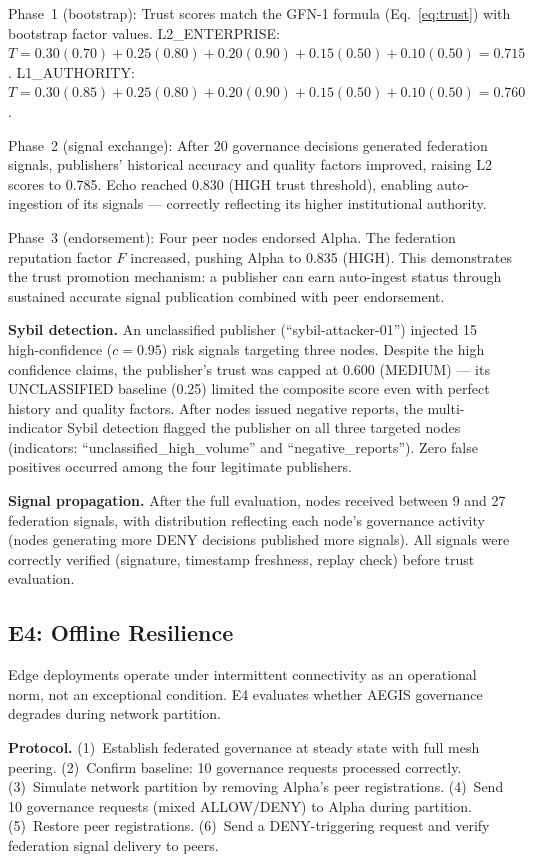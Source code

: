 \documentclass[journal]{IEEEtran}
\begin{document}
Phase~1 (bootstrap): Trust scores match the GFN-1 formula (Eq.~\ref{eq:trust}) with bootstrap factor values. L2\_ENTERPRISE: $T = 0.30(0.70) + 0.25(0.80) + 0.20(0.90) + 0.15(0.50) + 0.10(0.50) = 0.715$. L1\_AUTHORITY: $T = 0.30(0.85) + 0.25(0.80) + 0.20(0.90) + 0.15(0.50) + 0.10(0.50) = 0.760$.

Phase~2 (signal exchange): After 20 governance decisions generated federation signals, publishers' historical accuracy and quality factors improved, raising L2 scores to 0.785. Echo reached 0.830 (HIGH trust threshold), enabling auto-ingestion of its signals --- correctly reflecting its higher institutional authority.

Phase~3 (endorsement): Four peer nodes endorsed Alpha. The federation reputation factor $F$ increased, pushing Alpha to 0.835 (HIGH). This demonstrates the trust promotion mechanism: a publisher can earn auto-ingest status through sustained accurate signal publication combined with peer endorsement.

\textbf{Sybil detection.} An unclassified publisher (``sybil-attacker-01'') injected 15 high-confidence ($c = 0.95$) risk signals targeting three nodes. Despite the high confidence claims, the publisher's trust was capped at 0.600 (MEDIUM) --- its UNCLASSIFIED baseline (0.25) limited the composite score even with perfect history and quality factors. After nodes issued negative reports, the multi-indicator Sybil detection flagged the publisher on all three targeted nodes (indicators: ``unclassified\_high\_volume'' and ``negative\_reports''). Zero false positives occurred among the four legitimate publishers.

\textbf{Signal propagation.} After the full evaluation, nodes received between 9 and 27 federation signals, with distribution reflecting each node's governance activity (nodes generating more DENY decisions published more signals). All signals were correctly verified (signature, timestamp freshness, replay check) before trust evaluation.

\subsection{E4: Offline Resilience}

Edge deployments operate under intermittent connectivity as an operational norm, not an exceptional condition. E4 evaluates whether AEGIS governance degrades during network partition.

\textbf{Protocol.} (1)~Establish federated governance at steady state with full mesh peering. (2)~Confirm baseline: 10 governance requests processed correctly. (3)~Simulate network partition by removing Alpha's peer registrations. (4)~Send 10 governance requests (mixed ALLOW/DENY) to Alpha during partition. (5)~Restore peer registrations. (6)~Send a DENY-triggering request and verify federation signal delivery to peers.
\end{document}
